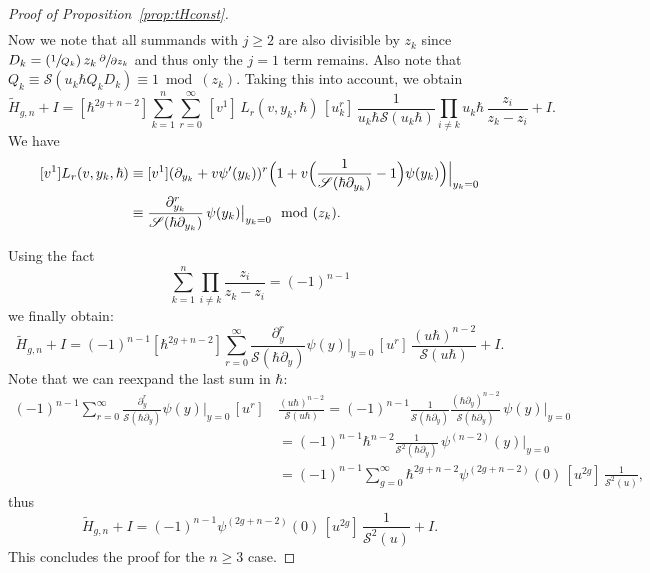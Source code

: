 \documentclass[JEP,XML,SOM,Unicode,NoEqCountersInSection,NoFloatCountersInSection]{cedram}
\let\mathcal\mathscr
\newcommand{\Psfrac}[2]{(\sfrac{#1}{#2})}
\theoremstyle{plain}
\theoremstyle{definition}
\theoremstyle{remark}
\newcommand{\cS}{\mathcal{S}}
\begin{document}
\begin{proof}[Proof of Proposition~\ref{prop:tHconst}]
\begin{multline}
\end{multline}
Now we note that all summands with $j\geq 2$ are also divisible by $z_k$ since $D_k=\Psfrac{1}{Q_k}\,z_k\,\sfrac{\partial}{\partial z_k}$ and thus only the $j=1$ term remains.
Also note that $Q_k\equiv \cS(u_k\hbar Q_kD_k)\equiv 1\bmod {(z_k)}$. Taking this into account, we obtain
\begin{equation*}
\widetilde{H}_{g,n}+I = [\hbar^{2g+n-2}]\sum\limits_{k=1}^n\sum\limits_{r=0}^\infty \,[v^1]\,L_r(v,y_k,\hbar)\,[u_k^r]\, \frac{1}{u_k\hbar \cS(u_k\hbar)}\prod\limits_{i\neq k}u_k\hbar\,\frac{z_i}{z_k-z_i} + I.
\end{equation*}
We have
\begin{equation}\label{eq:L1expr}
\begin{aligned}
{}[v^1]L_r(v,y_k,\hbar)&\equiv[v^1](\partial_{y_k}+v\psi'(y_k))^r \Bigl(1+v \Bigl(\frac1{\cS(\hbar\partial_{y_k})}-1 \Bigr)\psi(y_k) \Bigr)\Big|_{y_k=0} \\
&\equiv\frac{\partial_{y_k}^r}{\cS(\hbar \partial_{y_k})}\,\psi(y_k)\big|_{y_k=0} \mod{(z_k)}.
\end{aligned}
\end{equation}

Using the fact
\begin{equation*}
\sum\limits_{k=1}^n\prod\limits_{i\neq k} \frac{z_i}{z_k-z_i}=(-1)^{n-1}
\end{equation*}
we finally obtain:\vspace*{-5pt}
\begin{equation*}
\widetilde{H}_{g,n}+I=(-1)^{n-1}[\hbar^{2g+n-2}]\sum\limits_{r=0}^\infty \frac{\partial_{y}^r}{\cS(\hbar \partial_y)}\psi(y)\big|_{y=0} \,[u^r]\,\frac{(u\hbar)^{n-2}}{\cS(u\hbar)} + I.
\end{equation*}
Note that we can reexpand the last sum in $\hbar$:\vspace*{-5pt}
\begin{align*}\label{eq:psidertr}
(-1)^{n-1}\sum\limits_{r=0}^\infty \frac{\partial_{y}^r}{\cS(\hbar \partial_y)}\psi(y)\big|_{y=0} \,[u^r]\,&\frac{(u\hbar)^{n-2}}{\cS(u\hbar)}=(-1)^{n-1}\frac1{\cS(\hbar \partial_y)}\frac{(\hbar\partial_y)^{n-2}}{\cS(\hbar \partial_y)}\,\psi(y)\Big|_{y=0} \\
& = (-1)^{n-1}\hbar^{n-2}\frac1{\cS^2(\hbar \partial_y)}\,\psi^{(n-2)}(y)\Big|_{y=0}\\
& =(-1)^{n-1}\sum_{g=0}^\infty\hbar^{2g+n-2}\psi^{(2g+n-2)}(0)\,[u^{2g}]\,\frac1{\cS^2(u)},
\end{align*}
thus\vspace*{-5pt}
\begin{equation}\label{eq:Htildeansw}
\widetilde{H}_{g,n}+I=(-1)^{n-1}\psi^{(2g+n-2)}(0)\,[u^{2g}]\,\frac1{\cS^2(u)} + I.
\end{equation}
This concludes the proof for the $n\geq 3$ case.


\end{proof}
\end{document}
